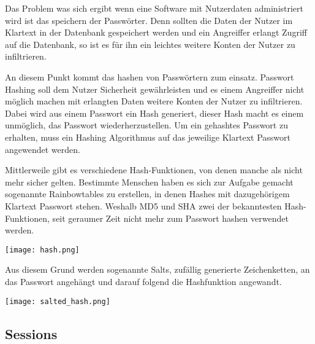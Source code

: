 \documentclass[11pt]{article}
\newcommand{\hlnote}[2]{#1}
\newcommand{\hlnote}[2]{\todo{#2}\texthl{#1}}
\begin{document}
		\begin{flushleft}
			Das Problem \hlnote{was sich ergibt}{Umstellen} wenn eine Software mit Nutzerdaten administriert wird ist das speichern der Passwörter. Denn sollten die Daten der Nutzer im Klartext in der Datenbank gespeichert werden und ein \hlnote{Angreiffer}{Typo} erlangt Zugriff auf die Datenbank, so ist es für ihn ein leichtes weitere Konten der Nutzer zu infiltrieren.\par\bigskip

			An diesem Punkt kommt das \hlnote{hashen}{Nominalisiert} von Passwörtern zum einsatz. Passwort Hashing soll dem Nutzer Sicherheit gewährleisten und es einem \hlnote{Angreiffer}{Typo} nicht möglich machen mit erlangten Daten weitere Konten der Nutzer zu infiltrieren. Dabei wird aus einem Passwort ein Hash generiert, dieser Hash macht es einem unmöglich, das Passwort wiederherzustellen. Um ein gehashtes Passwort zu erhalten, muss ein Hashing Algorithmus auf das jeweilige Klartext Passwort angewendet werden.\par\bigskip

			Mittlerweile gibt es verschiedene Hash-Funktionen, von denen manche als nicht mehr sicher gelten. \hlnote{Bestimmte}{Weasel} Menschen haben es sich zur Aufgabe gemacht sogenannte Rainbowtables zu erstellen, in denen Hashes mit dazugehörigem Klartext Passwort stehen. Weshalb MD5 und SHA zwei der bekanntesten Hash-Funktionen, seit geraumer Zeit nicht mehr zum Passwort hashen verwendet werden.

			\texttt{[image: hash.png]}\par\bigskip

			Aus diesem Grund werden sogenannte Salts, zufällig generierte Zeichenketten, an das Passwort angehängt und darauf folgend die Hashfunktion angewandt.

			\begin{center}
				\texttt{[image: salted\_hash.png]}
                        \end{center}
		\end{flushleft}

		\subsection{Sessions}
		\label{sec: sessions}
\end{document}
